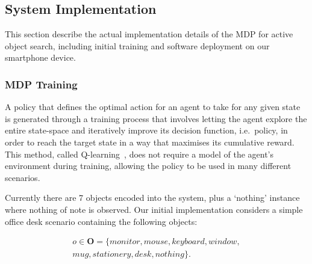 \documentclass[a4paper, twoside]{article}
\begin{document}


\subsection{System Implementation}

This section describe the actual implementation details of the MDP for active object search, including initial training and software deployment on our smartphone device.

\subsubsection{MDP Training} \label{sec:training}

\noindent A policy that defines the optimal action for an agent to take for any given state is generated through a training process that involves letting the agent explore the entire state-space and iteratively improve its decision function, i.e.\ policy, in order to reach the target state in a way that maximises its cumulative reward. This method, called Q-learning~\cite{Watkins1992}, does not require a model of the agent's environment during training, allowing the policy to be used in many different scenarios.

Currently there are 7 objects encoded into the system, plus a `nothing' instance where nothing of note is observed. Our initial implementation considers a simple office desk scenario containing the following objects:

\begin{equation}
  \begin{aligned}
    o\in \mathbf{O} = \{monitor, mouse, keyboard, window,\\mug, stationery, desk, nothing\}.
  \end{aligned}
\end{equation}
\end{document}
